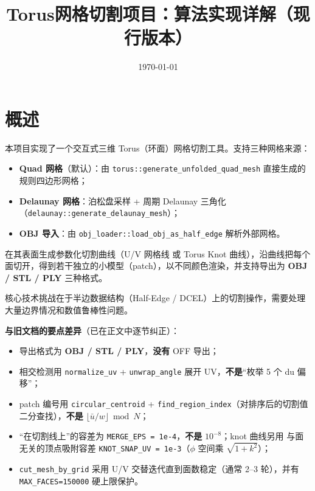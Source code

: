\documentclass[12pt,a4paper]{article}
\title{Torus网格切割项目：算法实现详解（现行版本）}
\author{}
\date{\today}
\begin{document}
\maketitle

\tableofcontents

\section{概述}

本项目实现了一个交互式三维 Torus（环面）网格切割工具。支持三种网格来源：
\begin{itemize}
\item \textbf{Quad 网格}（默认）：由 \texttt{torus::generate\_unfolded\_quad\_mesh} 直接生成的规则四边形网格；
\item \textbf{Delaunay 网格}：泊松盘采样 + 周期 Delaunay 三角化（\texttt{delaunay::generate\_delaunay\_mesh}）；
\item \textbf{OBJ 导入}：由 \texttt{obj\_loader::load\_obj\_as\_half\_edge} 解析外部网格。
\end{itemize}

在其表面生成参数化切割曲线（U/V 网格线 或 Torus Knot 曲线），沿曲线把每个面切开，得到若干独立的小模型（patch），以不同颜色渲染，并支持导出为 \textbf{OBJ / STL / PLY} 三种格式。

核心技术挑战在于半边数据结构（Half-Edge / DCEL）上的切割操作，需要处理大量边界情况和数值鲁棒性问题。

\textbf{与旧文档的要点差异}（已在正文中逐节纠正）：
\begin{itemize}
\item 导出格式为 \textbf{OBJ / STL / PLY}，\textbf{没有} OFF 导出；
\item 相交检测用 \texttt{normalize\_uv} + \texttt{unwrap\_angle} 展开 UV，\textbf{不是}“枚举 5 个 du 偏移”；
\item patch 编号用 \texttt{circular\_centroid} + \texttt{find\_region\_index}（对排序后的切割值二分查找），\textbf{不是} $\lfloor\bar u/w\rfloor\bmod N$；
\item “在切割线上”的容差为 \texttt{MERGE\_EPS = 1e-4}，\textbf{不是} $10^{-8}$；knot 曲线另用
  与面无关的顶点吸附容差 \texttt{KNOT\_SNAP\_UV = 1e-3}（$\phi$ 空间乘 $\sqrt{1+k^2}$）；
\item \texttt{cut\_mesh\_by\_grid} 采用 U/V 交替迭代直到面数稳定（通常 2–3 轮），并有 \texttt{MAX\_FACES=150000} 硬上限保护。
\end{itemize}
\end{document}
